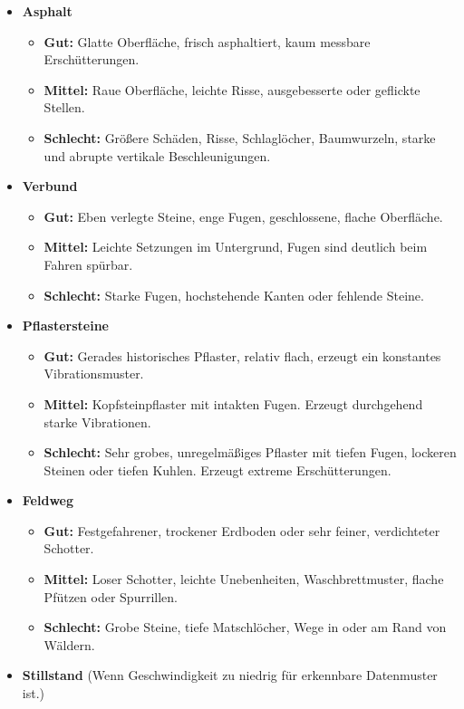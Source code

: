 \begin{itemize}
    \item \textbf{Asphalt}
    \begin{itemize}
        \item \textbf{Gut:} Glatte Oberfläche, frisch asphaltiert, kaum messbare Erschütterungen.
        \item \textbf{Mittel:} Raue Oberfläche, leichte Risse, ausgebesserte oder geflickte Stellen.
        \item \textbf{Schlecht:} Größere Schäden, Risse, Schlaglöcher, Baumwurzeln, starke und abrupte vertikale Beschleunigungen.
    \end{itemize}
    
    \item \textbf{Verbund}
    \begin{itemize}
        \item \textbf{Gut:} Eben verlegte Steine, enge Fugen, geschlossene, flache Oberfläche.
        \item \textbf{Mittel:} Leichte Setzungen im Untergrund, Fugen sind deutlich beim Fahren spürbar.
        \item \textbf{Schlecht:} Starke Fugen, hochstehende Kanten oder fehlende Steine.
    \end{itemize}
    
    \item \textbf{Pflastersteine}
    \begin{itemize}
        \item \textbf{Gut:} Gerades historisches Pflaster, relativ flach, erzeugt ein konstantes Vibrationsmuster.
        \item \textbf{Mittel:} Kopfsteinpflaster mit intakten Fugen. Erzeugt durchgehend starke Vibrationen.
        \item \textbf{Schlecht:} Sehr grobes, unregelmäßiges Pflaster mit tiefen Fugen, lockeren Steinen oder tiefen Kuhlen. Erzeugt extreme Erschütterungen.
    \end{itemize}
    
    \item \textbf{Feldweg}
    \begin{itemize}
        \item \textbf{Gut:} Festgefahrener, trockener Erdboden oder sehr feiner, verdichteter Schotter.
        \item \textbf{Mittel:} Loser Schotter, leichte Unebenheiten, Waschbrettmuster, flache Pfützen oder Spurrillen.
        \item \textbf{Schlecht:} Grobe Steine, tiefe Matschlöcher, Wege in oder am Rand von Wäldern.
    \end{itemize}
    \item \textbf{Stillstand} (Wenn Geschwindigkeit zu niedrig für erkennbare Datenmuster ist.)
\end{itemize}

